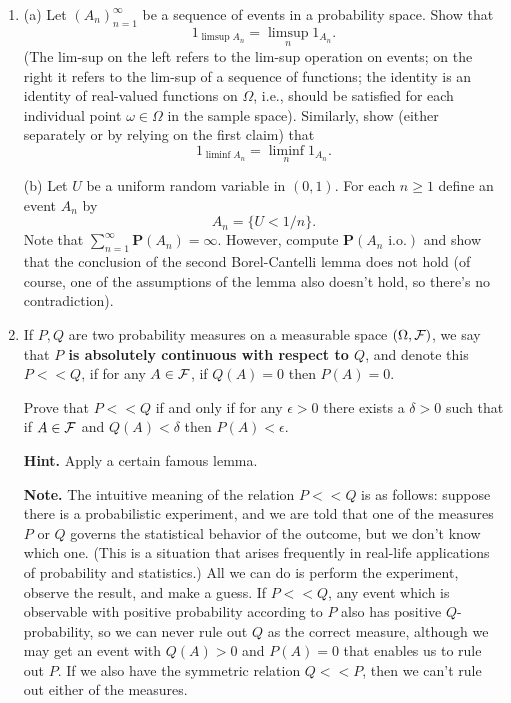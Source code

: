 \documentclass[12pt]{article}
\newcommand{\prob}{\mathbf{P}}
\theoremstyle{example}
\begin{document}
\begin{enumerate}
\item (a) Let $(A_n)_{n=1}^\infty$ be a sequence of events in a probability space. Show that
$$ 1_{\limsup A_n} = \limsup_n 1_{A_n}. $$
(The lim-sup on the left refers to the lim-sup operation on events; on the right it refers to the lim-sup of a sequence of functions; the identity is an identity of real-valued functions on $\Omega$, i.e., should be satisfied for each individual point $\omega \in \Omega$ in the sample space). Similarly, show (either separately or by relying on the first claim) that
$$ 1_{\liminf A_n} = \liminf_n 1_{A_n}. $$

\medskip \noindent
(b) Let $U$ be a uniform random variable in $(0,1)$. For each $n\ge 1$ define an event $A_n$ by
$$ A_n = \{U < 1/n\}. $$
Note that $\sum_{n=1}^\infty \prob(A_n) = \infty$. However, compute $\prob(A_n\textrm{ i.o.})$ and show that the conclusion of the second Borel-Cantelli lemma does not hold (of course, one of the assumptions of the lemma also doesn't hold, so there's no contradiction).

\item If $P,Q$ are two probability measures on a measurable space $(\Omega, {\cal F})$, we say that \textbf{$P$ is absolutely continuous with respect to $Q$}, and denote this $P<<Q$, if for any $A\in {\cal F}$, if $Q(A)=0$ then $P(A)=0$.

Prove that $P<<Q$ if and only if for any $\epsilon>0$ there exists a $\delta>0$ such that if $A\in {\cal F}$ and $Q(A)<\delta$ then $P(A)<\epsilon$. 

\medskip \noindent \textbf{Hint.} Apply a certain famous lemma.

\medskip \noindent
\textbf{Note.} The intuitive meaning of the relation $P<<Q$ is as follows: suppose there is a probabilistic experiment, and we are told that one of the measures $P$ or $Q$ governs the statistical behavior of the outcome, but we don't know which one. (This is a situation that arises frequently in real-life applications of probability and statistics.) All we can do is perform the experiment, observe the result, and make a guess. If $P<<Q$, any event which is observable with positive probability according to $P$ also has positive $Q$-probability, so we can never rule out $Q$ as the correct measure, although we may get an event with $Q(A)>0$ and $P(A)=0$ that enables us to rule out $P$. If we also have the symmetric relation $Q<<P$, then we can't rule out either of the measures.






\end{enumerate}
\end{document}
